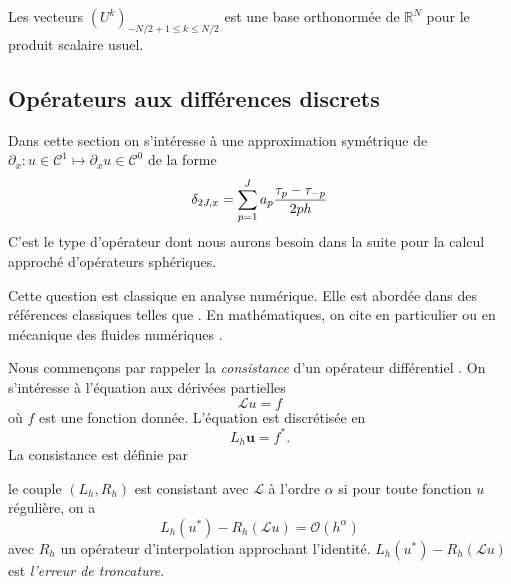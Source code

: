 Les vecteurs $(U^k)_{-N/2+1 \leq k \leq N/2}$ est une base orthonormée de $\mathbb{R}^N$ pour le produit scalaire usuel.



















\subsection{Opérateurs aux différences discrets}

Dans cette section on s'intéresse à une approximation symétrique de $\partial_x : u \in \mathcal{C}^1 \mapsto \partial_x u \in \mathcal{C}^0$ de la forme
\begin{equation}
\delta_{2J,x} = \displaystyle\sum\limits_{p=1}^J a_p \dfrac{\tau_p - \tau_{-p}}{2 p h}
\label{eq:explicite_dx}
\end{equation}
C'est le type d'opérateur dont nous aurons besoin dans la suite pour la calcul approché d'opérateurs sphériques.

Cette question est classique en analyse numérique. Elle est abordée dans des références classiques telles que \cite{Collatz2012, Ames2014, Kopal1955}. En mathématiques, on cite en particulier \cite{Collatz2012, Kopal1955} ou en mécanique des fluides numériques \cite{Hirsch2007}.

Nous commençons par rappeler la \textit{consistance} d'un opérateur différentiel \cite{Strikwerda2004}. On s’intéresse à l'équation aux dérivées partielles
\begin{equation}
\mathcal{L}u = f
\end{equation}
où $f$ est une fonction donnée. L'équation est discrétisée en
\begin{equation}
L_h \mathbf{u} = f^* .
\end{equation}
La consistance est définie par
\begin{definition}
le couple $(L_h, R_h)$ est consistant avec $\mathcal{L}$ à l'ordre $\alpha$ si pour toute fonction $u$ régulière, on a
\begin{equation}
L_h (u^*) -R_h \left( \mathcal{L}u \right) = \mathcal{O}(h^{\alpha})
\end{equation}
avec $R_h$ un opérateur d'interpolation approchant l'identité. $L_h (u^*) -R_h \left( \mathcal{L}u \right)$ est \textit{l'erreur de troncature}.
\label{def:consistance}
\end{definition}


